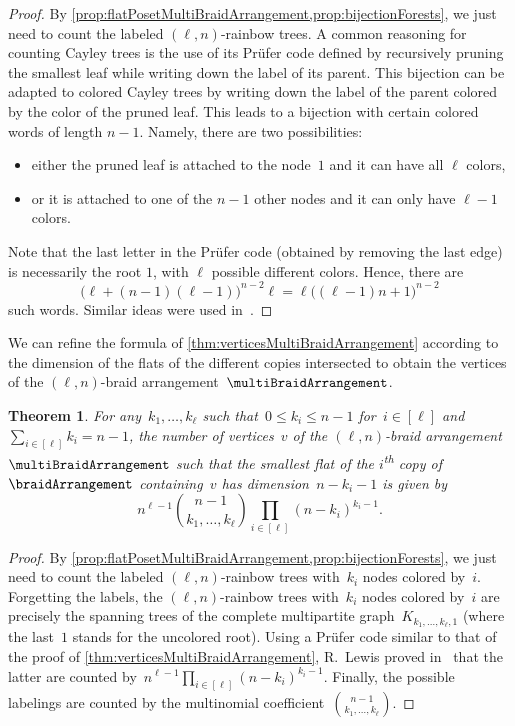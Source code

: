 \documentclass{amsart}
\newtheorem{theorem}{Theorem}[section]
\theoremstyle{definition}
\newcommand{\ordinal}{\textsuperscript{th}} %
\begin{document}
\begin{proof}
By \cref{prop:flatPosetMultiBraidArrangement,prop:bijectionForests}, we just need to count the labeled $(\ell,n)$-rainbow trees.
A common reasoning for counting Cayley trees is the use of its Prüfer code defined by recursively pruning the smallest leaf while writing down the label of its parent.
This bijection can be adapted to colored Cayley trees by writing down the label of the parent colored by the color of the pruned leaf.
This leads to a bijection with certain colored words of length $n-1$.
Namely, there are two possibilities:
\begin{itemize}
\item either the pruned leaf is attached to the node~$1$ and it can have all $\ell$ colors,
\item or it is attached to one of the $n-1$ other nodes and it can only have $\ell-1$ colors.
\end{itemize}
Note that the last letter in the Prüfer code (obtained by removing the last edge) is necessarily the root $1$, with $\ell$ possible different colors.
Hence, there are 
\[
\big( \ell+(n-1)(\ell-1) \big)^{n-2} \ell = \ell \big( (\ell-1) n + 1 \big)^{n-2}
\]
such words.
Similar ideas were used in~\cite{Lewis}.
\end{proof}

We can refine the formula of \cref{thm:verticesMultiBraidArrangement} according to the dimension of the flats of the different copies intersected to obtain the vertices of the $(\ell,n)$-braid arrangement~$\multiBraidArrangement$.

\begin{theorem}
\label{thm:verticesRefinedMultiBraidArrangement}
For any~$k_1, \dots, k_\ell$ such that~$0 \le k_i \le n-1$ for~$i \in [\ell]$ and~${\sum_{i \in [\ell]} k_i = n-1}$, the number of vertices~$v$ of the $(\ell,n)$-braid arrangement~$\multiBraidArrangement$ such that the smallest flat of the $i$\ordinal{} copy of~$\braidArrangement$ containing~$v$ has dimension~$n-k_i-1$ is given by
\[
n^{\ell-1} \binom{n-1}{k_1, \dots, k_\ell} \prod_{i \in [\ell]} (n-k_i)^{k_i-1}.
\]
\end{theorem}

\begin{proof}
By \cref{prop:flatPosetMultiBraidArrangement,prop:bijectionForests}, we just need to count the labeled $(\ell,n)$-rainbow trees with~$k_i$ nodes colored by~$i$.
Forgetting the labels, the $(\ell,n)$-rainbow trees with~$k_i$ nodes colored by~$i$ are precisely the spanning trees of the complete multipartite graph~$K_{k_1, \dots, k_\ell, 1}$ (where the last~$1$ stands for the uncolored root).
Using a Pr\"ufer code similar to that of the proof of \cref{thm:verticesMultiBraidArrangement}, R.~Lewis proved in~\cite{Lewis} that the latter are counted by~${n^{\ell-1} \prod_{i \in [\ell]} (n-k_i)^{k_i-1}}$.
Finally, the possible labelings are counted by the multinomial coefficient~$\binom{n-1}{k_1, \dots, k_\ell}$.
\end{proof}
\end{document}
